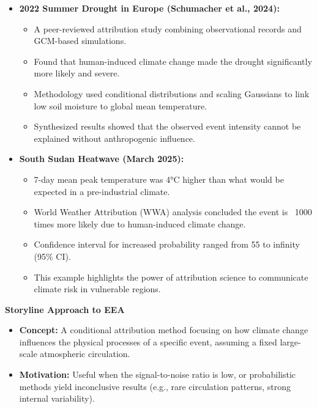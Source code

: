 \documentclass[fontsize=8pt, a4paper, landscape, fleqn]{scrartcl}
\renewcommand{\subsection}[1]{%
    \noindent\colorbox{subsectioncolor}{%
        \parbox{\dimexpr\columnwidth-2\fboxsep}{\color{white}\textbf{#1}}}%
    \vspace{0.5mm}%
}
\begin{document}
\begin{multicols*}{3}[\raggedcolumns]
\begin{itemize}
    \item \textbf{2022 Summer Drought in Europe (Schumacher et al., 2024):}
    \begin{itemize}
        \item A peer-reviewed attribution study combining observational records and GCM-based simulations.
        \item Found that human-induced climate change made the drought significantly more likely and severe.
        \item Methodology used conditional distributions and scaling Gaussians to link low soil moisture to global mean temperature.
        \item Synthesized results showed that the observed event intensity cannot be explained without anthropogenic influence.
    \end{itemize}

    \item \textbf{South Sudan Heatwave (March 2025):}
    \begin{itemize}
        \item 7-day mean peak temperature was 4°C higher than what would be expected in a pre-industrial climate.
        \item World Weather Attribution (WWA) analysis concluded the event is ~1000 times more likely due to human-induced climate change.
        \item Confidence interval for increased probability ranged from 55 to infinity (95\% CI).
        \item This example highlights the power of attribution science to communicate climate risk in vulnerable regions.
    \end{itemize}
\end{itemize}

\subsection{Storyline Approach to EEA}

\begin{itemize}
    \item \textbf{Concept:}  
    A conditional attribution method focusing on how climate change influences the physical processes of a specific event, assuming a fixed large-scale atmospheric circulation.

    \item \textbf{Motivation:}  
    Useful when the signal-to-noise ratio is low, or probabilistic methods yield inconclusive results (e.g., rare circulation patterns, strong internal variability).


\end{itemize}
\end{multicols*}
\end{document}

